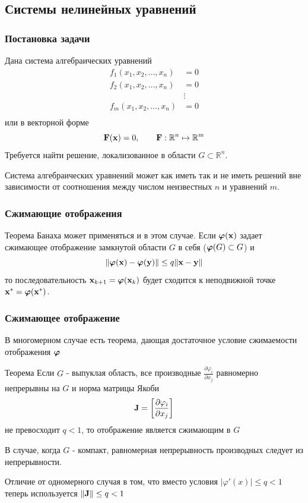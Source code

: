 \documentclass[apectratio=43,unicode]{beamer}
\begin{document}
\subsection{Системы нелинейных уравнений}
\begin{frame}
\frametitle{Постановка задачи}
	Дана система алгебраических уравнений
	\begin{align*}
	f_1(x_1,x_2,\dots,x_n) &= 0\\
	f_2(x_1,x_2,\dots,x_n) &= 0\\
	&\vdots\\
	f_m(x_1,x_2,\dots,x_n) &= 0\\
	\end{align*}
	или в векторной форме
	\[
	{\bf F}({\bf x}) = 0, \qquad {\bf F}: \mathbb{R}^n \mapsto \mathbb{R}^m
	\]
	Требуется найти решение, локализованное в области $G \subset \mathbb{R}^n$.

	Система алгебраических уравнений может как иметь так и не иметь решений вне зависимости от 
	соотношения между числом неизвестных $n$ и уравнений $m$.
\end{frame}

\begin{frame}
\frametitle{Сжимающие отображения}
	Теорема Банаха может применяться и в этом случае. Если ${\boldsymbol \varphi}({\bf x})$ задает сжимающее отображение 
	замкнутой области $G$ в себя (${\boldsymbol \varphi}(G) \subset G$) и
	\[
	\|{\boldsymbol \varphi}({\bf x}) - {\boldsymbol \varphi}({\bf y})\| \leq q \|{\bf x} - {\bf y}\|
	\]
	то последовательность ${\bf x}_{k+1} = {\boldsymbol \varphi}({\bf x}_k)$ будет сходится к неподвижной точке ${\bf x}^* = {\boldsymbol \varphi}({\bf x}^*)$.
\end{frame}

\begin{frame}
\frametitle{Сжимающее отображение}
	В многомерном случае есть теорема, дающая достаточное условие сжимаемости отображения ${\boldsymbol \varphi}$
	\begin{block}{Теорема}
		Если $G$ - выпуклая область, все производные $\frac{\partial \varphi_i}{\partial x_j}$
		равномерно непрерывны на $G$ и норма матрицы Якоби
		$$
		{\bf J} = \left[\frac{\partial \varphi_i}{\partial x_j} \right]
		$$
		не превосходит $q < 1$, то отображение является сжимающим в $G$
	\end{block}
	В случае, когда $G$ - компакт, равномерная непрерывность производных следует из непрерывности.

	Отличие от одномерного случая в том, что вместо условия $|\varphi'(x)| \leq q < 1$ теперь используется $\|{\bf J}\| \leq q < 1$
\end{frame}

%
%
\end{document}
